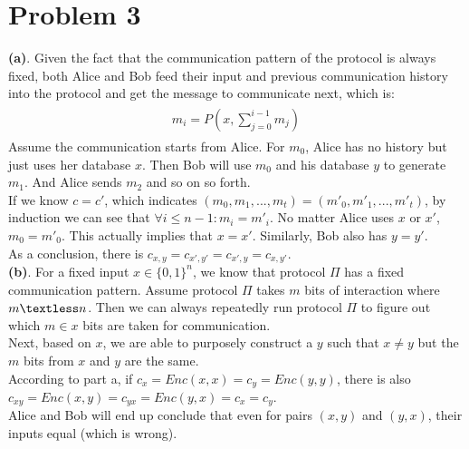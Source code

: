 \documentclass[titlepage, paper=a4, fontsize=11pt]{scrartcl} %
\numberwithin{equation}{section} %
\numberwithin{figure}{section} %
\numberwithin{table}{section} %
\begin{document}

\section*{Problem 3}
\textbf{(a)}. Given the fact that the communication pattern of the protocol is always fixed,
both Alice and Bob feed their input and previous communication history into the protocol and get the message
to communicate next, which is:
\begin{align*} 
\begin{split}
m_i = P(x, \sum_{j=0}^{i-1} m_{j})
\end{split}					
\end{align*}
Assume the communication starts from Alice. For $m_0$, Alice has no history but just uses her database $x$.
Then Bob will use $m_0$ and his database $y$ to generate $m_1$. And Alice sends $m_2$ and so on so forth. \\

If we know $c=c'$, which indicates $(m_0,m_1,...,m_t)=(m'_0,m'_1,...,m'_t)$, by induction we can see that
$\forall i \leqslant n-1: m_i=m'_i$. No matter Alice uses $x$ or $x'$, $m_0=m'_0$. This actually implies that $x=x'$. Similarly, Bob also has $y=y'$. \\

As a conclusion, there is $c_{x,y}=c_{x',y'}=c_{x',y}=c_{x,y'}$. \\


\textbf{(b)}. For a fixed input $x \in \{0,1\}^n$, we know that protocol $\Pi$ has a fixed communication pattern.
Assume protocol $\Pi$ takes $m$ bits of interaction where $m \textless n$.
Then we can always repeatedly run protocol $\Pi$ to figure out which $m \in x$ bits are taken for communication. \\

Next, based on $x$, we are able to purposely construct a $y$ such that $x \neq y$ but the $m$ bits from
$x$ and $y$ are the same. \\

According to part a, if $c_x=Enc(x,x)=c_y=Enc(y,y)$, there is also $c_{xy}=Enc(x,y)=c_{yx}=Enc(y,x)=c_x=c_y$. \\

Alice and Bob will end up conclude that even for pairs $(x,y)$ and $(y,x)$, their inputs equal (which is wrong).
\\
\end{document}
